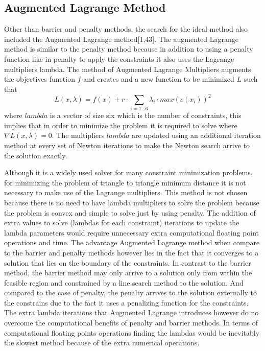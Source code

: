 \documentclass[times,12pt]{ACME2015article}
\begin{document}
\clearpage

\subsection{Augmented Lagrange Method}
Other than barrier and penalty methods, the search for the ideal method also included the Augmented Lagrange method[1,43]. The augmented Lagrange method is similar to the penalty method  because in addition to using a penalty function like in penalty to apply the constraints it also uses the Lagrange multipliers lambda.
The method of Augmented Lagrange Multipliers augments the objectives function $f$ and creates and a new function to be minimized $L$ such that 
\begin{equation}
L(x, \lambda) = f(x)+ r \cdot \sum_{i=1...6} \lambda_{i} \cdot max(c(x_{i}))^{2}
\end{equation} where $lambda$ is a vector of size six which is the number of constraints, this implies that in order to minimize the problem it is required to solve where $\nabla L(x, \lambda) = 0$. The multipliers $lambda$ are updated using an additional iteration method at every set of Newton iterations to make the Newton search arrive to the solution exactly.

Although it is a widely used solver for many constraint minimization problems, for minimizing the problem of triangle to triangle minimum distance it is not necessary to make use of the Lagrange multipliers. This method is not chosen because there is no need to have lambda multipliers to solve the problem because the problem is convex and simple to solve just by using penalty. The addition of extra values to solve (lambdas for each constraint) iterations to update the lambda parameters would require unnecessary extra computational floating point operations and time. The advantage Augmented Lagrange method when compare to the barrier and penalty methods however lies in the fact that it converges to a solution that lies on the boundary of the constraints. In contrast to the barrier method, the barrier method may only arrive to a solution only from within the feasible region and constrained by a line search method to the solution. And compared to the case of penalty, the penalty arrives to the solution externally to the constrains due to the fact it uses a penalizing function for the constraints. The extra lambda iterations that Augmented Lagrange introduces however do no overcome the computational benefits of penalty and barrier methods. In terms of computational floating points operations finding the lambdas would be inevitably the slowest method because of the extra numerical operations.  
\end{document}
